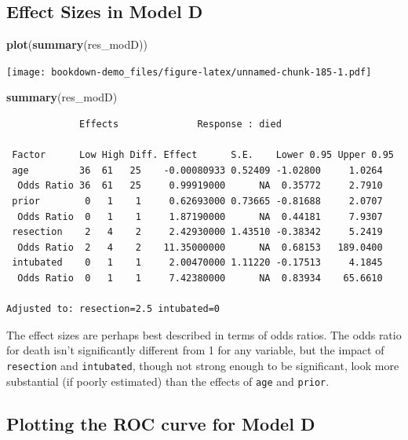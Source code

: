 \documentclass[]{book}
\newenvironment{Shaded}{\begin{snugshade}}{\end{snugshade}}
\newcommand{\KeywordTok}[1]{\textcolor[rgb]{0.13,0.29,0.53}{\textbf{#1}}}
\newcommand{\NormalTok}[1]{#1}
\theoremstyle{definition}
\theoremstyle{definition}
\theoremstyle{definition}
\theoremstyle{remark}
\begin{document}
\subsection{Effect Sizes in Model D}\label{effect-sizes-in-model-d}

\begin{Shaded}
\begin{Highlighting}[]
\KeywordTok{plot}\NormalTok{(}\KeywordTok{summary}\NormalTok{(res_modD))}
\end{Highlighting}
\end{Shaded}

\texttt{[image: bookdown-demo\_files/figure-latex/unnamed-chunk-185-1.pdf]}

\begin{Shaded}
\begin{Highlighting}[]
\KeywordTok{summary}\NormalTok{(res_modD)}
\end{Highlighting}
\end{Shaded}

\begin{verbatim}
             Effects              Response : died 

 Factor      Low High Diff. Effect      S.E.    Lower 0.95 Upper 0.95
 age         36  61   25    -0.00080933 0.52409 -1.02800     1.0264  
  Odds Ratio 36  61   25     0.99919000      NA  0.35772     2.7910  
 prior        0   1    1     0.62693000 0.73665 -0.81688     2.0707  
  Odds Ratio  0   1    1     1.87190000      NA  0.44181     7.9307  
 resection    2   4    2     2.42930000 1.43510 -0.38342     5.2419  
  Odds Ratio  2   4    2    11.35000000      NA  0.68153   189.0400  
 intubated    0   1    1     2.00470000 1.11220 -0.17513     4.1845  
  Odds Ratio  0   1    1     7.42380000      NA  0.83934    65.6610  

Adjusted to: resection=2.5 intubated=0  
\end{verbatim}

The effect sizes are perhaps best described in terms of odds ratios. The
odds ratio for death isn't significantly different from 1 for any
variable, but the impact of \texttt{resection} and \texttt{intubated},
though not strong enough to be significant, look more substantial (if
poorly estimated) than the effects of \texttt{age} and \texttt{prior}.

\subsection{Plotting the ROC curve for Model
D}\label{plotting-the-roc-curve-for-model-d}
\end{document}
